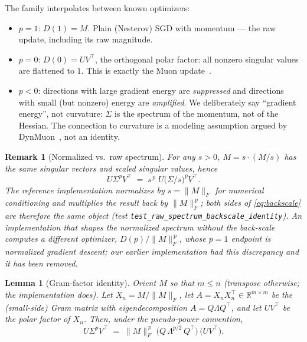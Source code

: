 \documentclass{article}
\newtheorem{lemma}{Lemma}
\newtheorem{remark}{Remark}
\begin{document}
The family interpolates between known optimizers:
\begin{itemize}
\item $p = 1$: $D(1) = M$. Plain (Nesterov) SGD with momentum --- the raw
update, including its raw magnitude.
\item $p = 0$: $D(0) = U V^\top$, the orthogonal polar factor: all nonzero
singular values are flattened to $1$. This is exactly the Muon
update~\cite{jordan2024muon}.
\item $p < 0$: directions with large gradient energy are \emph{suppressed}
and directions with small (but nonzero) energy are \emph{amplified}. We
deliberately say ``gradient energy'', not curvature: $\Sigma$ is the spectrum
of the momentum, not of the Hessian. The connection to curvature is a
modeling assumption argued by DynMuon~\cite{wu2026dynmuon}, not an identity.
\end{itemize}

\begin{remark}[Normalized vs.\ raw spectrum]
\label{rem:backscale}
For any $s>0$, $M = s \cdot (M/s)$ has the same singular vectors and scaled
singular values, hence
\begin{equation}
\label{eq:backscale}
U \Sigma^p V^\top \;=\; s^{\,p}\; U \bigl(\Sigma/s\bigr)^{p} V^\top .
\end{equation}
The reference implementation normalizes by $s = \|M\|_F$ for numerical
conditioning and multiplies the result back by $\|M\|_F^{\,p}$; both sides of
\eqref{eq:backscale} are therefore the same object
(test \texttt{test\_raw\_spectrum\_backscale\_identity}). An implementation
that shapes the normalized spectrum \emph{without} the back-scale computes a
different optimizer, $D(p)/\|M\|_F^{\,p}$, whose $p=1$ endpoint is
\emph{normalized} gradient descent; our earlier implementation had this
discrepancy and it has been removed.
\end{remark}

\begin{lemma}[Gram-factor identity]
\label{lem:gram}
Orient $M$ so that $m \le n$ (transpose otherwise; the implementation does).
Let $X_n = M / \|M\|_F$, let $A = X_n X_n^\top \in \mathbb{R}^{m\times m}$ be
the (small-side) Gram matrix with eigendecomposition $A = Q \Lambda Q^\top$,
and let $UV^\top$ be the polar factor of $X_n$. Then, under the pseudo-power
convention,
\begin{equation}
\label{eq:gram}
U \Sigma^p V^\top \;=\; \|M\|_F^{\,p}\; \bigl(Q\,\Lambda^{p/2}\,Q^\top\bigr)\,
\bigl(U V^\top\bigr).
\end{equation}
\end{lemma}
\end{document}
